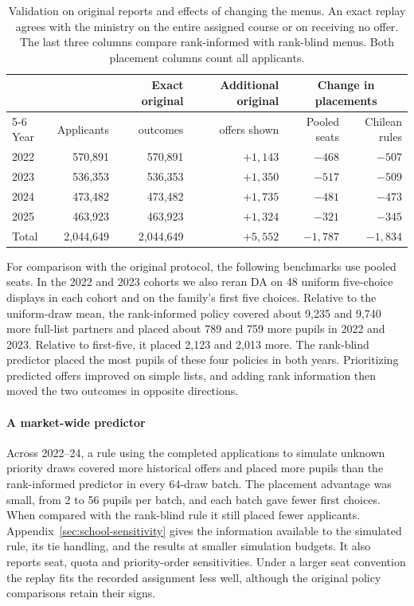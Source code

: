 \begin{table}[ht]\centering\small
\caption{Validation on original reports and effects of changing the menus. An exact replay agrees with the ministry on the entire assigned course or on receiving no offer. The last three columns compare rank-informed with rank-blind menus. Both placement columns count all applicants.}\label{tab:chile-frozen}
\begin{tabular}{@{}lrrr rr@{}}\toprule
& & Exact original & Additional original & \multicolumn{2}{c}{Change in placements}\\
\cmidrule(l){5-6}
Year & Applicants & outcomes & offers shown & Pooled seats & Chilean rules\\\midrule
2022 & 570,891 & 570,891 & $+1,143$ & $-468$ & $-507$\\
2023 & 536,353 & 536,353 & $+1,350$ & $-517$ & $-509$\\
2024 & 473,482 & 473,482 & $+1,735$ & $-481$ & $-473$\\
2025 & 463,923 & 463,923 & $+1,324$ & $-321$ & $-345$\\\midrule
Total & 2,044,649 & 2,044,649 & $+5,552$ & $-1,787$ & $-1,834$\\\bottomrule
\end{tabular}
\end{table}

For comparison with the original protocol, the following benchmarks use pooled seats. In the 2022 and 2023 cohorts we also reran DA on 48 uniform five-choice displays in each cohort and on the family's first five choices. Relative to the uniform-draw mean, the rank-informed policy covered about 9,235 and 9,740 more full-list partners and placed about 789 and 759 more pupils in 2022 and 2023. Relative to first-five, it placed 2,123 and 2,013 more. The rank-blind predictor placed the most pupils of these four policies in both years. Prioritizing predicted offers improved on simple lists, and adding rank information then moved the two outcomes in opposite directions.


\paragraph{A market-wide predictor}
Across 2022--24, a rule using the completed applications to simulate unknown priority draws covered more historical offers and placed more pupils than the rank-informed predictor in every 64-draw batch. The placement advantage was small, from 2 to 56 pupils per batch, and each batch gave fewer first choices. When compared with the rank-blind rule it still placed fewer applicants. Appendix~\ref{sec:school-sensitivity} gives the information available to the simulated rule, its tie handling, and the results at smaller simulation budgets. It also reports seat, quota and priority-order sensitivities. Under a larger seat convention the replay fits the recorded assignment less well, although the original policy comparisons retain their signs.


